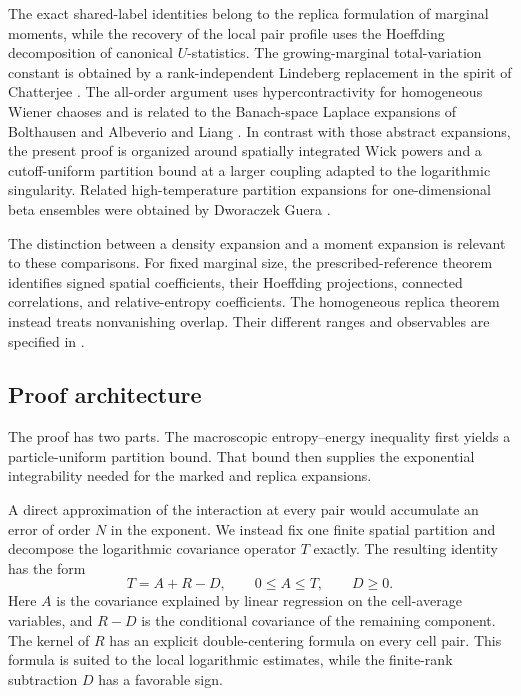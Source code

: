 \documentclass[11pt,reqno]{amsart}
\numberwithin{equation}{section}
\theoremstyle{plain}
\theoremstyle{definition}
\begin{document}
The exact shared-label identities belong to the replica formulation of marginal moments, while the recovery of the local pair profile uses the Hoeffding decomposition of canonical $U$-statistics.  The growing-marginal total-variation constant is obtained by a rank-independent Lindeberg replacement in the spirit of Chatterjee \cite{Chatterjee2006}.  The all-order argument uses hypercontractivity for homogeneous Wiener chaoses \cite{NourdinPeccatiReinert2010} and is related to the Banach-space Laplace expansions of Bolthausen \cite{Bolthausen1986} and Albeverio and Liang \cite{AlbeverioLiang2005}.  In contrast with those abstract expansions, the present proof is organized around spatially integrated Wick powers and a cutoff-uniform partition bound at a larger coupling adapted to the logarithmic singularity.  Related high-temperature partition expansions for one-dimensional beta ensembles were obtained by Dworaczek Guera \cite{DworaczekGuera2024}.


The distinction between a density expansion and a moment expansion is relevant to these comparisons. For fixed marginal size, the prescribed-reference theorem identifies signed spatial coefficients, their Hoeffding projections, connected correlations, and relative-entropy coefficients. The homogeneous replica theorem instead treats nonvanishing overlap. Their different ranges and observables are specified in .

\subsection{Proof architecture}
\label{subsec:proof-architecture}

The proof has two parts. The macroscopic entropy--energy inequality first yields a particle-uniform partition bound. That bound then supplies the exponential integrability needed for the marked and replica expansions.

A direct approximation of the interaction at every pair would accumulate an error of order $N$ in the exponent.  We instead fix one finite spatial partition and decompose the logarithmic covariance operator $T$ exactly.  The resulting identity has the form
\begin{equation}
 T=A+R-D,
 \qquad
 0\leq A\leq T,
 \qquad
 D\geq0.
 \label{eq:intro-regression-decomposition}
\end{equation}
Here $A$ is the covariance explained by linear regression on the cell-average variables, and $R-D$ is the conditional covariance of the remaining component. The kernel of $R$ has an explicit double-centering formula on every cell pair. This formula is suited to the local logarithmic estimates, while the finite-rank subtraction $D$ has a favorable sign.
\end{document}

